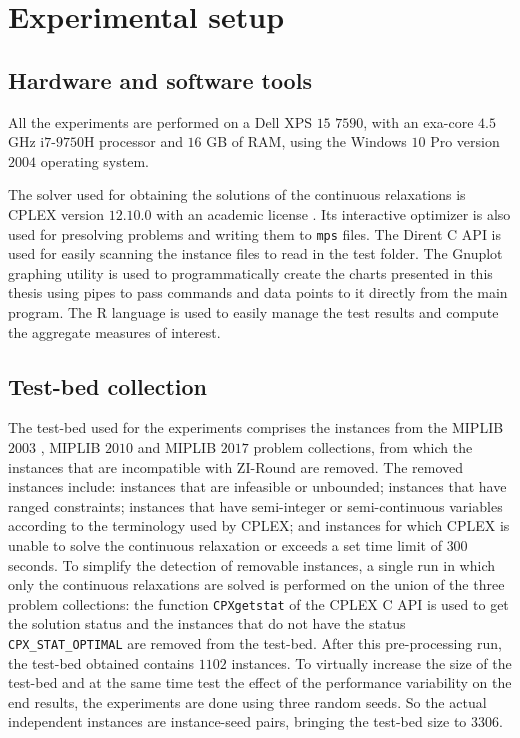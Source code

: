\documentclass[a4paper,12pt,twoside]{scrbook}
\begin{document}
\section{Experimental setup} \label{sec:expsetup}

\subsection{Hardware and software tools}
All the experiments are performed on a Dell XPS $15$ $7590$, with an exa-core $4.5$ GHz i$7$-$9750$H processor and $16$ GB of RAM, using the Windows $10$ Pro version $2004$ operating system. \par

The solver used for obtaining the solutions of the continuous relaxations is CPLEX version $12$.$10$.$0$ with an academic license \cite{cplex}. Its interactive optimizer is also used for presolving problems and writing them to \texttt{mps} files.
The Dirent C API \cite{dirent} is used for easily scanning the instance files to read in the test folder.
The Gnuplot \cite{gnuplot} graphing utility is used to programmatically create the charts presented in this thesis using pipes to pass commands and data points to it directly from the main program.
The R language \cite{rlang} is used to easily manage the test results and compute the aggregate measures of interest.

\subsection{Test-bed collection}

The test-bed used for the experiments comprises the instances from the MIPLIB $2003$ \cite{miplib2003}, MIPLIB $2010$ \cite{miplib2010} and MIPLIB $2017$ \cite{miplib2017} problem collections, from which the instances that are incompatible with ZI-Round are removed.
The removed instances include: instances that are infeasible or unbounded; instances that have ranged constraints; instances that have semi-integer or semi-continuous variables according to the terminology used by CPLEX; and instances for which CPLEX is unable to solve the continuous relaxation or exceeds a set time limit of $300$ seconds. To simplify the detection of removable instances, a single run in which only the continuous relaxations are solved is performed on the union of the three problem collections: the function \texttt{CPXgetstat} of the CPLEX C API is used to get the solution status and the instances that do not have the status \texttt{CPX\_STAT\_OPTIMAL} are removed from the test-bed. After this pre-processing run, the test-bed obtained contains $1102$ instances.
To virtually increase the size of the test-bed and at the same time test the effect of the performance variability on the end results, the experiments are done using three random seeds. So the actual independent instances are instance-seed pairs, bringing the test-bed size to $3306$. \par 
\end{document}
